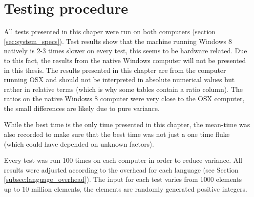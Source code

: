 \section{Testing procedure}
All tests presented in this chaper were run on both computers (section \ref{sec:system_specs}). Test results show that the machine running Windows 8 natively is 2-3 times slower on every test, this seems to be hardware related. Due to this fact, the results from the native Windows computer will not be presented in this thesis. The results presented in this chapter are from the computer running OSX and should not be interpreted in absolute numerical values but rather in relative terms (which is why some tables contain a ratio column). The ratios on the native Windows 8 computer were very close to the OSX computer, the small differences are likely due to pure variance.

While the best time is the only time presented in this chapter, the mean-time was also recorded to make sure that the best time was not just a one time fluke (which could have depended on unknown factors). 

Every test was run 100 times on each computer in order to reduce variance. All results were adjusted according to the overhead for each language (see Section \ref{subsec:language_overhead}). The input for each test varies from 1000 elements up to 10 million elements, the elements are randomly generated positive integers. 